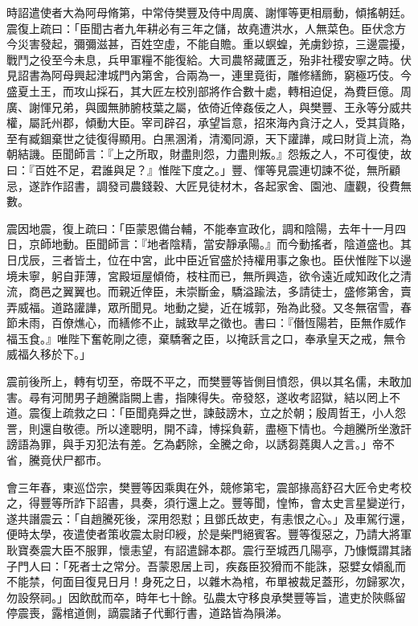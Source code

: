 \begin{pinyinscope}
時詔遣使者大為阿母脩第，中常侍樊豐及侍中周廣、謝惲等更相扇動，傾搖朝廷。震復上疏曰：「臣聞古者九年耕必有三年之儲，故堯遭洪水，人無菜色。臣伏念方今災害發起，彌彌滋甚，百姓空虛，不能自贍。重以螟蝗，羌虜鈔掠，三邊震擾，戰鬥之役至今未息，兵甲軍糧不能復給。大司農帑藏匱乏，殆非社稷安寧之時。伏見詔書為阿母興起津城門內第舍，合兩為一，連里竟街，雕修繕飾，窮極巧伎。今盛夏土王，而攻山採石，其大匠左校別部將作合數十處，轉相迫促，為費巨億。周廣、謝惲兄弟，與國無肺腑枝葉之屬，依倚近倖姦佞之人，與樊豐、王永等分威共權，屬託州郡，傾動大臣。宰司辟召，承望旨意，招來海內貪汙之人，受其貨賂，至有臧錮棄世之徒復得顯用。白黑溷淆，清濁同源，天下讙譁，咸曰財貨上流，為朝結譏。臣聞師言：『上之所取，財盡則怨，力盡則叛。』怨叛之人，不可復使，故曰：『百姓不足，君誰與足？』惟陛下度之。」豐、惲等見震連切諫不從，無所顧忌，遂詐作詔書，調發司農錢穀、大匠見徒材木，各起家舍、園池、廬觀，役費無數。

震因地震，復上疏曰：「臣蒙恩備台輔，不能奉宣政化，調和陰陽，去年十一月四日，京師地動。臣聞師言：『地者陰精，當安靜承陽。』而今動搖者，陰道盛也。其日戊辰，三者皆土，位在中宮，此中臣近官盛於持權用事之象也。臣伏惟陛下以邊境未寧，躬自菲薄，宮殿垣屋傾倚，枝柱而已，無所興造，欲令遠近咸知政化之清流，商邑之翼翼也。而親近倖臣，未崇斷金，驕溢踰法，多請徒士，盛修第舍，賣弄威福。道路讙譁，眾所聞見。地動之變，近在城郭，殆為此發。又冬無宿雪，春節未雨，百僚燋心，而繕修不止，誠致旱之徵也。書曰：『僭恆陽若，臣無作威作福玉食。』唯陛下奮乾剛之德，棄驕奢之臣，以掩訞言之口，奉承皇天之戒，無令威福久移於下。」

震前後所上，轉有切至，帝既不平之，而樊豐等皆側目憤怨，俱以其名儒，未敢加害。尋有河閒男子趙騰詣闕上書，指陳得失。帝發怒，遂收考詔獄，結以罔上不道。震復上疏救之曰：「臣聞堯舜之世，諫鼓謗木，立之於朝；殷周哲王，小人怨詈，則還自敬德。所以達聰明，開不諱，博採負薪，盡極下情也。今趙騰所坐激訐謗語為罪，與手刃犯法有差。乞為虧除，全騰之命，以誘芻蕘輿人之言。」帝不省，騰竟伏尸都市。

會三年春，東巡岱宗，樊豐等因乘輿在外，競修第宅，震部掾高舒召大匠令史考校之，得豐等所詐下詔書，具奏，須行還上之。豐等聞，惶怖，會太史言星變逆行，遂共譖震云：「自趙騰死後，深用怨懟；且鄧氏故吏，有恚恨之心。」及車駕行還，便時太學，夜遣使者策收震太尉印綬，於是柴門絕賓客。豐等復惡之，乃請大將軍耿寶奏震大臣不服罪，懷恚望，有詔遣歸本郡。震行至城西几陽亭，乃慷慨謂其諸子門人曰：「死者士之常分。吾蒙恩居上司，疾姦臣狡猾而不能誅，惡嬖女傾亂而不能禁，何面目復見日月！身死之日，以雜木為棺，布單被裁足蓋形，勿歸冢次，勿設祭祠。」因飲酖而卒，時年七十餘。弘農太守移良承樊豐等旨，遣吏於陝縣留停震喪，露棺道側，謫震諸子代郵行書，道路皆為隕涕。


\end{pinyinscope}
